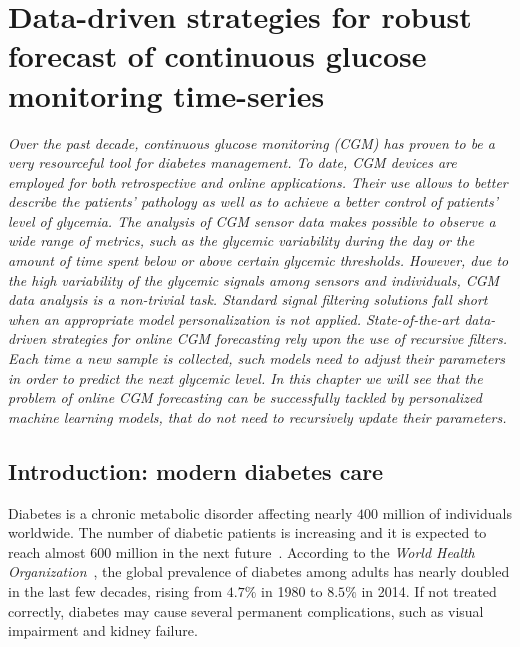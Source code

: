 
\chapter{Data-driven strategies for robust forecast of continuous glucose monitoring time-series} \label{chap:diabete}

\begin{displayquote}
\textit{Over the past decade, continuous glucose monitoring (CGM) has proven to be a very resourceful tool for diabetes management. To date, CGM devices are employed for both retrospective and online applications. Their use allows to better describe the patients' pathology as well as to achieve a better control  of  patients' level of glycemia. The analysis of CGM sensor data makes possible to observe a wide range of metrics, such as the glycemic variability during the day or the amount of time spent below or above certain glycemic thresholds. However, due to the high variability of the glycemic signals among sensors and individuals, CGM data analysis is a non-trivial task. Standard signal filtering solutions fall short when an appropriate model personalization is not applied. State-of-the-art data-driven strategies for online CGM forecasting rely upon the use of recursive filters. Each time a new sample is collected, such models need to adjust their parameters in order to predict the next glycemic level. In this chapter we will see that the problem of online CGM forecasting can be successfully tackled by personalized machine learning models, that do not need to recursively update their parameters.}
\end{displayquote}

\section{Introduction: modern diabetes care}
Diabetes is a chronic metabolic disorder affecting nearly $400$ million of individuals worldwide. The number of diabetic patients is increasing and it is expected to reach almost $600$ million in the next future~\cite{guariguata2014global}.
According to the {\em World Health Organization}~\cite{world2016global}, the global prevalence of diabetes among adults has nearly doubled in the last few decades, rising from $4.7\%$ in 1980 to $8.5\%$ in 2014.
If not treated correctly, diabetes may cause several permanent complications, such as visual impairment and kidney failure. 

